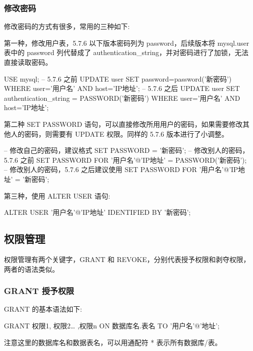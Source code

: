 \subsubsection{修改密码}

修改密码的方式有很多，常用的三种如下:

第一种，修改用户表，5.7.6 以下版本密码列为 password，后续版本将 mysql.user 表中的 password 列代替成了 authentication\_string，并对密码进行了加锁，无法直接读取密码。

\begin{sql}
USE mysql;
-- 5.7.6 之前
UPDATE user SET password=password('新密码') 
    WHERE user='用户名' AND host='IP地址';
-- 5.7.6 之后
UPDATE user SET authentication_string = PASSWORD('新密码')
    WHERE user='用户名' AND host='IP地址';
\end{sql}

第二种 SET PASSWORD 语句，可以直接修改所用用户的密码，如果需要修改其他人的密码，则需要有 UPDATE 权限。同样的 5.7.6 版本进行了小调整。

\begin{sql}
-- 修改自己的密码，建议格式
SET PASSWORD = '新密码';
-- 修改别人的密码，5.7.6 之前
SET PASSWORD FOR '用户名'@'IP地址' = PASSWORD('新密码');
-- 修改别人的密码，5.7.6 之后建议使用
SET PASSWORD FOR '用户名'@'IP地址' = '新密码';
\end{sql}

第三种，使用 ALTER USER 语句:

\begin{sql}
ALTER USER '用户名'@'IP地址' IDENTIFIED BY '新密码';
\end{sql}

\subsection{权限管理}

权限管理有两个关键字，GRANT 和 REVOKE，分别代表授予权限和剥夺权限，两者的语法类似。

\subsubsection{GRANT 授予权限}

GRANT 的基本语法如下:
\begin{sql}
GRANT 权限1, 权限2… ,权限n ON 数据库名.表名 TO '用户名'@'地址';
\end{sql}

注意这里的数据库名和数据表名，可以用通配符 * 表示所有数据库/表。

